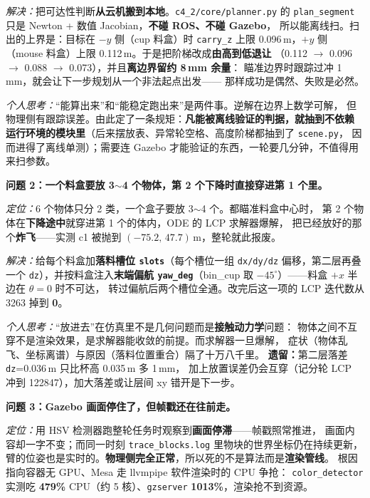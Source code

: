 \documentclass[12pt,a4paper]{ctexart}
\begin{document}
\textit{解决：}把可达性判断\textbf{从云机搬到本地}。\texttt{c4\_2/core/planner.py} 的
\texttt{plan\_segment} 只是 Newton + 数值 Jacobian，\textbf{不碰 ROS、不碰 Gazebo}，
所以能离线扫。扫出的上界是：目标在 $-y$ 侧（cup 料盒）时 \texttt{carry\_z} 上限
0.096\,m，$+y$ 侧（mouse 料盒）上限 0.112\,m。于是把阶梯改成\textbf{由高到低退让}
（0.112 $\to$ 0.096 $\to$ 0.088 $\to$ 0.073），并且\textbf{离边界留约 8\,mm 余量}：
瞄准边界时跟踪过冲 1\,mm，就会让下一步规划从一个非法起点出发——
那样成功是偶然、失败是必然。

\textit{个人思考：}“能算出来”和“能稳定跑出来”是两件事。逆解在边界上数学可解，
但物理侧有跟踪误差。由此定了一条规矩：\textbf{凡能被离线验证的判据，就抽到不依赖
运行环境的模块里}（后来摆放表、异常轮空格、高度阶梯都抽到了 \texttt{scene.py}，
因而进得了离线单测）；需要连 Gazebo 才能验证的东西，一轮要几分钟，不值得用来扫参数。

\medskip
\textbf{问题 2：一个料盒要放 3$\sim$4 个物体，第 2 个下降时直接穿进第 1 个里。}

\textit{定位：}6 个物体只分 2 类，一个盒子要放 3$\sim$4 个。都瞄准料盒中心时，
第 2 个物体在\textbf{下降途中}就穿进第 1 个的体内，ODE 的 LCP 求解器爆解，
把已经放好的那个\textbf{炸飞}——实测 c1 被抛到 $(-75.2,\,47.7)$\,m，整轮就此报废。

\textit{解决：}给每个料盒加\textbf{落料槽位 \texttt{slots}}（每个槽位一组
\texttt{dx/dy/dz} 偏移，第二层再叠一个 \texttt{dz}），并按料盒注入\textbf{末端偏航
\texttt{yaw\_deg}}（bin\_cup 取 $-45^\circ$）——料盒 $+x$ 半边在 $\theta=0$ 时不可达，
转过偏航后两个槽位全通。改完后这一项的 LCP 迭代数从 3263 掉到 \textbf{0}。

\textit{个人思考：}“放进去”在仿真里不是几何问题而是\textbf{接触动力学}问题：
物体之间不互穿不是渲染效果，是求解器能收敛的前提。而求解器一旦爆解，
症状（物体乱飞、坐标离谱）与原因（落料位置重合）隔了十万八千里。
\textbf{遗留：}第二层落差 \texttt{dz}=0.036\,m 只比杯高 0.035\,m 多 1\,mm，
加上放置误差仍会互穿（记分轮 LCP 冲到 122847），加大落差或让层间 xy 错开是下一步。

\medskip
\textbf{问题 3：Gazebo 画面停住了，但帧戳还在往前走。}

\textit{定位：}用 HSV 检测器跑整轮任务时观察到\textbf{画面停滞}——帧戳照常推进，
画面内容却一字不变；而同一时刻 \texttt{trace\_blocks.log} 里物块的世界坐标仍在持续更新，
臂的位姿也是实时的。\textbf{物理侧完全正常}，所以死的不是算法而是\textbf{渲染管线}。
根因指向容器无 GPU、Mesa 走 llvmpipe 软件渲染时的 CPU 争抢：
\texttt{color\_detector} 实测吃 \textbf{479\%} CPU（约 5 核）、\texttt{gzserver}
\textbf{1013\%}，渲染抢不到资源。
\end{document}

